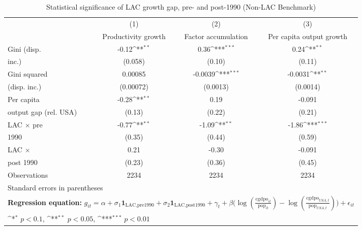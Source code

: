 \begin{table}[htbp]\centering
\def\sym#1{\ifmmode^{#1}\else\(^{#1}\)\fi}
\caption{Statistical significance of LAC growth gap, pre- and post-1990 (Non-LAC Benchmark)}
\begin{tabular}{l*{3}{c}}
\toprule
                &\multicolumn{1}{c}{(1)}&\multicolumn{1}{c}{(2)}&\multicolumn{1}{c}{(3)}\\
                &\multicolumn{1}{c}{Productivity growth}&\multicolumn{1}{c}{Factor accumulation}&\multicolumn{1}{c}{Per capita output growth}\\
\midrule
Gini (disp.     &    -0.12\sym{**} &     0.36\sym{***}&     0.24\sym{**} \\
inc.)           &  (0.058)         &   (0.10)         &   (0.11)         \\
\addlinespace
Gini squared    &  0.00085         &  -0.0039\sym{***}&  -0.0031\sym{**} \\
(disp. inc.)    &(0.00072)         & (0.0013)         & (0.0014)         \\
\addlinespace
Per capita      &    -0.28\sym{**} &     0.19         &   -0.091         \\
output gap (rel. USA)&   (0.13)         &   (0.22)         &   (0.21)         \\
\addlinespace
LAC $\times$ pre&    -0.77\sym{**} &    -1.09\sym{**} &    -1.86\sym{***}\\
1990            &   (0.35)         &   (0.44)         &   (0.59)         \\
\addlinespace
LAC $\times$    &     0.21         &    -0.30         &   -0.091         \\
post 1990       &   (0.23)         &   (0.36)         &   (0.45)         \\
\midrule
Observations    &     2234         &     2234         &     2234         \\
\bottomrule
\multicolumn{4}{l}{\footnotesize Standard errors in parentheses}\\
\multicolumn{4}{l}{\footnotesize \textbf{Regression equation:} \(g_{it} = \alpha + \sigma_1 \mathbf{1}_{\textrm{LAC,pre1990}} + \sigma_2 \mathbf{1}_{\textrm{LAC,post1990}} + \gamma_t + \beta \big(\log (\frac{\textrm{cgdpo}_{it}}{\textrm{pop}_{it}} ) - \log (\frac{\textrm{cgdpo}_{USA,t}}{\textrm{pop}_{USA,t}}  ) \big) + \epsilon_{it}\)}\\
\multicolumn{4}{l}{\footnotesize \sym{*} \(p<0.1\), \sym{**} \(p<0.05\), \sym{***} \(p<0.01\)}\\
\end{tabular}
\end{table}
